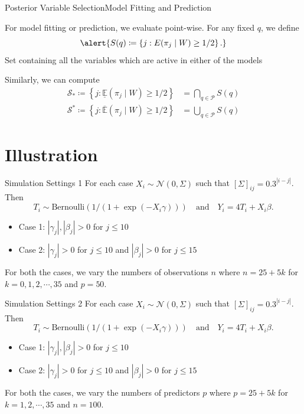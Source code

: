 \documentclass[aspectratio=169]{beamer}					%
\begin{document}
\begin{frame}{Posterior Variable Selection}{Model Fitting and Prediction}

For model fitting or prediction, we evaluate point-wise. For any fixed $q$, we define
\begin{equation}
	\alert{S(q)\coloneqq
	\left\{j : E(\pi_j\mid W) \ge 1/2\right\}.}
\end{equation}
\alert{Set containing all the variables which are active in
either of the models}

Similarly, we can compute
\begin{align}
    \mathcal{S}_*\coloneqq \left\{j:\underline{\mathbb{E}} (\pi_j\mid W)\ge1/2\right\}
    &= \bigcap_{q\in \mathcal{P}}S(q)
    \\
    \mathcal{S}^*\coloneqq \left\{j:\overline{\mathbb{E}} (\pi_j\mid W)\ge1/2\right\}
    &= \bigcup_{q\in \mathcal{P}}S(q)
\end{align}
\end{frame}
\fi

\section{Illustration}
\begin{frame}{Simulation Settings 1}
For each case $X_i\sim\mathcal{N}(0, \Sigma)$
 such that $\left[\Sigma\right]_{ij} = 0.3 ^{|i-j|}$. Then
\begin{equation}
    T_i \sim \text{Bernoulli}\left(1/(1+\exp(-X_i\gamma))\right)
    \quad\text{and}\quad
    Y_i = 4T_i + X_i\beta.
\end{equation}

\begin{itemize}
    \item Case 1: $|\gamma_j|, |\beta_j|>0$ for $j\le 10$
    \item Case 2: $|\gamma_j|>0$ for $j\le 10$ and $|\beta_j|>0$ for $j\le 15$
\end{itemize}

For both the cases, we vary the numbers of observations $n$ where
$n=25 + 5k$ for $k=0,1,2,\cdots,35$ and $p = 50$.

\end{frame}

\begin{frame}{Simulation Settings 2}
For each case $X_i\sim\mathcal{N}(0, \Sigma)$
 such that $\left[\Sigma\right]_{ij} = 0.3 ^{|i-j|}$. Then
\begin{equation}
    T_i \sim \text{Bernoulli}\left(1/(1+\exp(-X_i\gamma))\right)
    \quad\text{and}\quad
    Y_i = 4T_i + X_i\beta.
\end{equation}

\begin{itemize}
    \item Case 1: $|\gamma_j|, |\beta_j|>0$ for $j\le 10$
    \item Case 2: $|\gamma_j|>0$ for $j\le 10$ and $|\beta_j|>0$ for $j\le 15$
\end{itemize}

For both the cases, we vary the numbers of predictors $p$ where
$p=25 + 5k$ for $k=1,2,\cdots,35$ and $n=100$.

\end{frame}
\end{document}
